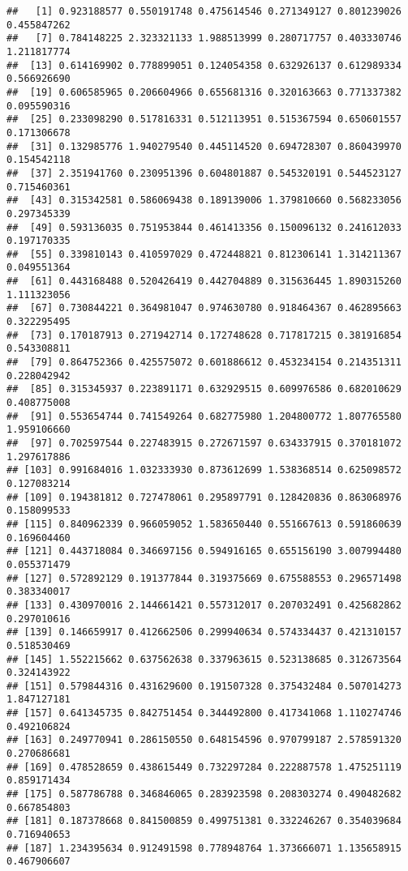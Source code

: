 \documentclass[
]{article}
\begin{document}
\begin{verbatim}
##   [1] 0.923188577 0.550191748 0.475614546 0.271349127 0.801239026 0.455847262
##   [7] 0.784148225 2.323321133 1.988513999 0.280717757 0.403330746 1.211817774
##  [13] 0.614169902 0.778899051 0.124054358 0.632926137 0.612989334 0.566926690
##  [19] 0.606585965 0.206604966 0.655681316 0.320163663 0.771337382 0.095590316
##  [25] 0.233098290 0.517816331 0.512113951 0.515367594 0.650601557 0.171306678
##  [31] 0.132985776 1.940279540 0.445114520 0.694728307 0.860439970 0.154542118
##  [37] 2.351941760 0.230951396 0.604801887 0.545320191 0.544523127 0.715460361
##  [43] 0.315342581 0.586069438 0.189139006 1.379810660 0.568233056 0.297345339
##  [49] 0.593136035 0.751953844 0.461413356 0.150096132 0.241612033 0.197170335
##  [55] 0.339810143 0.410597029 0.472448821 0.812306141 1.314211367 0.049551364
##  [61] 0.443168488 0.520426419 0.442704889 0.315636445 1.890315260 1.111323056
##  [67] 0.730844221 0.364981047 0.974630780 0.918464367 0.462895663 0.322295495
##  [73] 0.170187913 0.271942714 0.172748628 0.717817215 0.381916854 0.543308811
##  [79] 0.864752366 0.425575072 0.601886612 0.453234154 0.214351311 0.228042942
##  [85] 0.315345937 0.223891171 0.632929515 0.609976586 0.682010629 0.408775008
##  [91] 0.553654744 0.741549264 0.682775980 1.204800772 1.807765580 1.959106660
##  [97] 0.702597544 0.227483915 0.272671597 0.634337915 0.370181072 1.297617886
## [103] 0.991684016 1.032333930 0.873612699 1.538368514 0.625098572 0.127083214
## [109] 0.194381812 0.727478061 0.295897791 0.128420836 0.863068976 0.158099533
## [115] 0.840962339 0.966059052 1.583650440 0.551667613 0.591860639 0.169604460
## [121] 0.443718084 0.346697156 0.594916165 0.655156190 3.007994480 0.055371479
## [127] 0.572892129 0.191377844 0.319375669 0.675588553 0.296571498 0.383340017
## [133] 0.430970016 2.144661421 0.557312017 0.207032491 0.425682862 0.297010616
## [139] 0.146659917 0.412662506 0.299940634 0.574334437 0.421310157 0.518530469
## [145] 1.552215662 0.637562638 0.337963615 0.523138685 0.312673564 0.324143922
## [151] 0.579844316 0.431629600 0.191507328 0.375432484 0.507014273 1.847127181
## [157] 0.641345735 0.842751454 0.344492800 0.417341068 1.110274746 0.492106824
## [163] 0.249770941 0.286150550 0.648154596 0.970799187 2.578591320 0.270686681
## [169] 0.478528659 0.438615449 0.732297284 0.222887578 1.475251119 0.859171434
## [175] 0.587786788 0.346846065 0.283923598 0.208303274 0.490482682 0.667854803
## [181] 0.187378668 0.841500859 0.499751381 0.332246267 0.354039684 0.716940653
## [187] 1.234395634 0.912491598 0.778948764 1.373666071 1.135658915 0.467906607

\end{verbatim}
\end{document}
